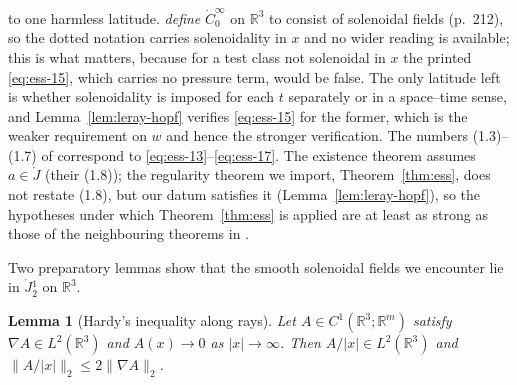 \documentclass[11pt]{article}
\newtheorem{lemma}[theorem]{Lemma}
\theoremstyle{definition}
\theoremstyle{plain}
\newcommand{\R}{\mathbb R}
\newcommand{\norm}[1]{\lVert #1\rVert}
\begin{document}
to one harmless latitude.  \cite{ESS2003} \emph{define} $\dot C_0^\infty$ on
$\R^3$ to consist of solenoidal fields (p.~212), so the dotted notation
carries solenoidality in $x$ and no wider reading is available; this is what
matters, because for a test class not solenoidal in $x$ the printed
\eqref{eq:ess-15}, which carries no pressure term, would be false.  The only
latitude left is whether solenoidality is imposed for each $t$ separately or
in a space--time sense, and Lemma~\ref{lem:leray-hopf} verifies
\eqref{eq:ess-15} for the former, which is the weaker requirement on $w$ and
hence the stronger verification.
The numbers (1.3)--(1.7) of \cite{ESS2003} correspond to
\eqref{eq:ess-13}--\eqref{eq:ess-17}.  The existence theorem
\cite[Theorem~1.1]{ESS2003} assumes $a\in\mathring J$ (their (1.8)); the
regularity theorem we import, Theorem~\ref{thm:ess}, does not restate (1.8),
but our datum satisfies it (Lemma~\ref{lem:leray-hopf}), so the hypotheses
under which Theorem~\ref{thm:ess} is applied are at least as strong as those
of the neighbouring theorems in \cite{ESS2003}.

Two preparatory lemmas show that the smooth solenoidal fields we encounter
lie in $\mathring J{}^1_2$ on $\R^3$.

\begin{lemma}[Hardy's inequality along rays]\label{lem:hardy}
Let $A\in C^1(\R^3;\R^m)$ satisfy $\nabla A\in L^2(\R^3)$ and
$A(x)\to0$ as $|x|\to\infty$.  Then $A/|x|\in L^2(\R^3)$ and
$\norm{A/|x|}_2\leq2\norm{\nabla A}_2$.
\end{lemma}
\end{document}
